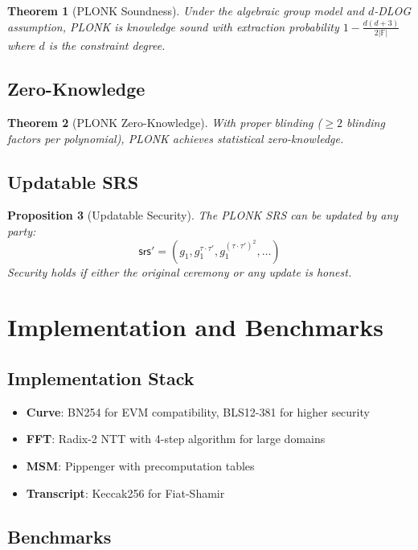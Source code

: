 \documentclass[11pt,a4paper]{article}
\newtheorem{theorem}{Theorem}[section]
\newtheorem{proposition}[theorem]{Proposition}
\newcommand{\F}{\mathbb{F}}
\begin{document}
\begin{theorem}[PLONK Soundness]
Under the algebraic group model and $d$-DLOG assumption, PLONK is knowledge sound with extraction probability $1 - \frac{d(d+3)}{2|\F|}$ where $d$ is the constraint degree.
\end{theorem}

\subsection{Zero-Knowledge}

\begin{theorem}[PLONK Zero-Knowledge]
With proper blinding ($\geq 2$ blinding factors per polynomial), PLONK achieves statistical zero-knowledge.
\end{theorem}

\subsection{Updatable SRS}

\begin{proposition}[Updatable Security]
The PLONK SRS can be updated by any party:
\[
\mathsf{srs}' = (g_1, g_1^{\tau \cdot \tau'}, g_1^{(\tau \cdot \tau')^2}, \ldots)
\]
Security holds if either the original ceremony or any update is honest.
\end{proposition}

\section{Implementation and Benchmarks}
\label{sec:implementation}

\subsection{Implementation Stack}

\begin{itemize}
    \item \textbf{Curve}: BN254 for EVM compatibility, BLS12-381 for higher security
    \item \textbf{FFT}: Radix-2 NTT with 4-step algorithm for large domains
    \item \textbf{MSM}: Pippenger with precomputation tables
    \item \textbf{Transcript}: Keccak256 for Fiat-Shamir
\end{itemize}

\subsection{Benchmarks}
\end{document}
